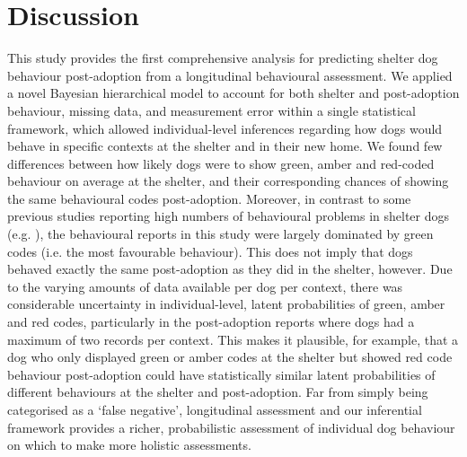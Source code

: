 \documentclass[12pt]{article}
\begin{document}
\section{Discussion}
This study provides the first comprehensive analysis for predicting shelter dog behaviour post-adoption from a longitudinal behavioural assessment. We applied a novel Bayesian hierarchical model to account for both shelter and post-adoption behaviour, missing data, and measurement error within a single statistical framework, which allowed individual-level inferences regarding how dogs would behave in specific contexts at the shelter and in their new home. We found few differences between how likely dogs were to show green, amber and red-coded behaviour on average at the shelter, and their corresponding chances of showing the same behavioural codes post-adoption. Moreover, in contrast to some previous studies reporting high numbers of behavioural problems in shelter dogs (e.g. \cite{gates2018}), the behavioural reports in this study were largely dominated by green codes (i.e. the most favourable behaviour). This does not imply that dogs behaved exactly the same post-adoption as they did in the shelter, however. Due to the varying amounts of data available per dog per context, there was considerable uncertainty in individual-level, latent probabilities of green, amber and red codes, particularly in the post-adoption reports where dogs had a maximum of two records per context. This makes it plausible, for example, that a dog who only displayed green or amber codes at the shelter but showed red code behaviour post-adoption could have statistically similar latent probabilities of different behaviours at the shelter and post-adoption. Far from simply being categorised as a `false negative', longitudinal assessment and our inferential framework provides a richer, probabilistic assessment of individual dog behaviour on which to make more holistic assessments.
\end{document}
